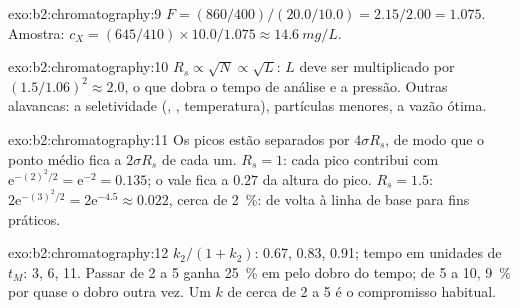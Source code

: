\begin{solution}{exo:b2:chromatography:9}
$F = (860/400)/(20.0/10.0) = 2.15/2.00 = 1.075$. Amostra: $c_X = (645/410) \times 10.0/1.075 \approx
\qty{14.6}{mg/L}$.
\end{solution}

\begin{solution}{exo:b2:chromatography:10}
$R_s \propto \sqrt N \propto \sqrt L$: $L$ deve ser multiplicado por $(1.5/1.06)^2 \approx 2.0$, o que
dobra o tempo de análise e a pressão. Outras alavancas: a seletividade (, ,
temperatura), partículas menores, a vazão ótima.
\end{solution}

\begin{solution}{exo:b2:chromatography:11}
Os picos estão separados por $4\sigma R_s$, de modo que o ponto médio fica a $2\sigma R_s$ de cada um. $R_s = 1$: cada pico
contribui com $\mathrm e^{-(2)^2/2} = \mathrm e^{-2} = 0.135$; o vale fica a $0.27$ da altura do pico.
$R_s = 1.5$: $2\mathrm e^{-(3)^2/2} = 2\mathrm e^{-4.5} \approx 0.022$, cerca de 2~\%: de volta à linha de
base para fins práticos.
\end{solution}

\begin{solution}{exo:b2:chromatography:12}
$k_2/(1+k_2)$: 0.67, 0.83, 0.91; tempo em unidades de $t_M$: 3, 6, 11. Passar de 2 a 5 ganha 25~\% em
 pelo dobro do tempo; de 5 a 10, 9~\% por quase o dobro outra vez. Um $k$ de cerca de 2 a 5 é o
compromisso habitual.
\end{solution}

